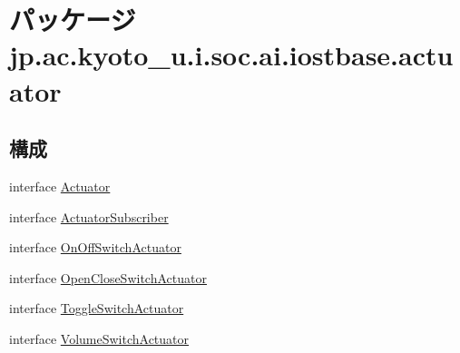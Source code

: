 \hypertarget{namespacejp_1_1ac_1_1kyoto__u_1_1i_1_1soc_1_1ai_1_1iostbase_1_1actuator}{\section{パッケージ jp.\-ac.\-kyoto\-\_\-u.\-i.\-soc.\-ai.\-iostbase.\-actuator}
\label{namespacejp_1_1ac_1_1kyoto__u_1_1i_1_1soc_1_1ai_1_1iostbase_1_1actuator}
}
\subsection*{構成}
\begin{DoxyCompactItemize}
\item 
interface \hyperlink{interfacejp_1_1ac_1_1kyoto__u_1_1i_1_1soc_1_1ai_1_1iostbase_1_1actuator_1_1_actuator}{Actuator}
\item 
interface \hyperlink{interfacejp_1_1ac_1_1kyoto__u_1_1i_1_1soc_1_1ai_1_1iostbase_1_1actuator_1_1_actuator_subscriber}{Actuator\-Subscriber}
\item 
interface \hyperlink{interfacejp_1_1ac_1_1kyoto__u_1_1i_1_1soc_1_1ai_1_1iostbase_1_1actuator_1_1_on_off_switch_actuator}{On\-Off\-Switch\-Actuator}
\item 
interface \hyperlink{interfacejp_1_1ac_1_1kyoto__u_1_1i_1_1soc_1_1ai_1_1iostbase_1_1actuator_1_1_open_close_switch_actuator}{Open\-Close\-Switch\-Actuator}
\item 
interface \hyperlink{interfacejp_1_1ac_1_1kyoto__u_1_1i_1_1soc_1_1ai_1_1iostbase_1_1actuator_1_1_toggle_switch_actuator}{Toggle\-Switch\-Actuator}
\item 
interface \hyperlink{interfacejp_1_1ac_1_1kyoto__u_1_1i_1_1soc_1_1ai_1_1iostbase_1_1actuator_1_1_volume_switch_actuator}{Volume\-Switch\-Actuator}
\end{DoxyCompactItemize}
